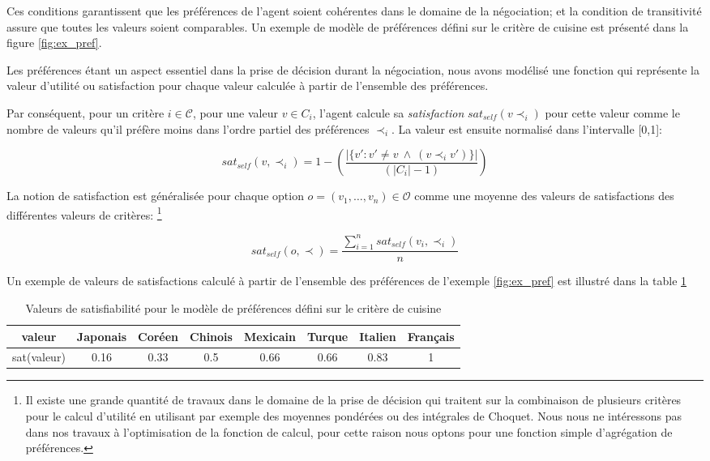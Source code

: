 			 Ces conditions garantissent que les préférences de l'agent soient cohérentes dans le domaine de la négociation; et la condition de transitivité assure que toutes les valeurs soient comparables. Un exemple de modèle de préférences défini sur le critère de cuisine est présenté dans la figure \ref{fig:ex_pref}.
			
			
			Les préférences étant un aspect essentiel dans la prise de décision durant la négociation, nous avons modélisé une fonction qui représente la valeur d'utilité ou satisfaction pour chaque valeur calculée à partir de l'ensemble des préférences. 
			
			Par conséquent, pour un critère $i\in \mathcal{C}$, pour une valeur $v\in C_i$, l'agent calcule sa \emph{satisfaction} $sat_{self}(v \prec_i)$ pour cette valeur comme le nombre de valeurs qu'il préfère moins dans l'ordre partiel des préférences $\prec_i$. La valeur est ensuite normalisé dans l'intervalle [0,1]:
			
			\begin{equation}
			sat_{self}(v, \prec_i) =	1 - \left( \frac{|\{v' : v' \neq v \  \wedge \ (v \prec_i v')\}| }{( |C_i| - 1 )}\right)
			\end{equation}
			
			La notion de satisfaction est généralisée pour chaque option $ o= (v_1, \ldots, v_n) \in \mathcal{O}$ comme une moyenne des valeurs de satisfactions des différentes valeurs de critères: 
			\footnote{Il existe une grande quantité de travaux  dans le domaine de la prise de décision  qui traitent sur la combinaison de plusieurs critères pour le calcul d'utilité en utilisant par exemple des moyennes pondérées ou des intégrales de Choquet. Nous nous ne intéressons pas dans nos travaux à l'optimisation de la fonction de calcul, pour cette raison nous optons pour une fonction simple d'agrégation de préférences.}
	
			\begin{equation}
			sat_{self}(o, \prec) = \frac{\sum_{i=1}^{n} sat_{self}(v_i, \prec_i) }{n}
			\end{equation}
		
			Un exemple de valeurs de satisfactions calculé à partir de l'ensemble des préférences de l'exemple \ref{fig:ex_pref} est illustré dans la table \ref{tab:sat}
					\begin{table}[h]
						\centering
								{\scriptsize
						\begin{tabular}{ |c|c|c|c|c|c|c|c| }
							\hline				
							valeur & Japonais & Coréen & Chinois &  Mexicain & Turque & Italien & Français \\
							\hline
							
							sat(valeur) & 0.16 & 0.33 & 0.5 & 0.66 & 0.66 & 0.83 & 1\\
							\hline
							
						\end{tabular}}
						\caption{Valeurs de satisfiabilité pour le modèle de préférences défini sur le critère de cuisine}
						\label{tab:sat}
					\end{table}
	
